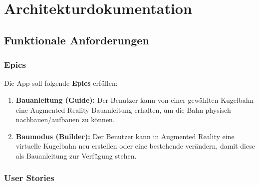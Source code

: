 \section{Architekturdokumentation}\label{appendix:architekturdokumentation}
\subsection{Funktionale Anforderungen}\label{appendix:funktionale-anforderungen}
\subsubsection{Epics}
Die App soll folgende \textbf{Epics} erfüllen:
\begin{enumerate}
	\item \textbf{Bauanleitung (Guide):} Der Benutzer kann von einer gewählten Kugelbahn eine Augmented Reality Bauanleitung erhalten, um die Bahn physisch nachbauen/aufbauen zu können.
	\item \textbf{Baumodus (Builder):} Der Benutzer kann in Augmented Reality eine virtuelle Kugelbahn neu erstellen oder eine bestehende verändern, damit diese als Bauanleitung zur Verfügung stehen.
\end{enumerate}

\subsubsection{User Stories}\label{appendix:user-stories}

